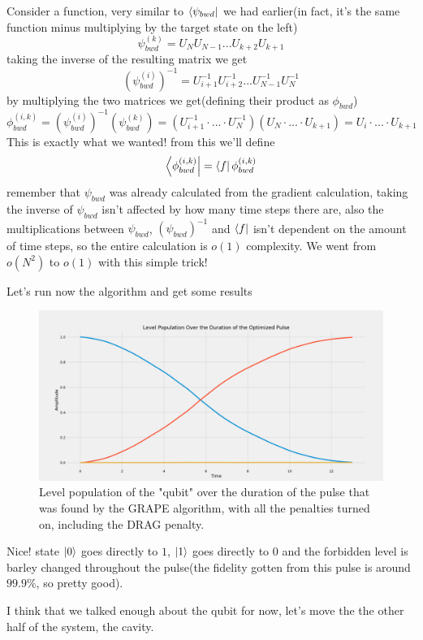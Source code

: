 \documentclass[english, a4paper, 12pt, twoside]{article}
\numberwithin{equation}{section} %
\begin{document}
Consider a function, very similar to  $\bra{\psi_{bwd}}$ we had earlier(in fact, it's the same function minus multiplying by the target state on the left)
\[
    \psi_{bwd}^{(k)} = U_NU_{N-1}...U_{k+2}U_{k+1}
\]
taking the inverse of the resulting matrix we get
\[
    (\psi_{bwd}^{(i)})^{-1} = U_{i+1}^{-1}U_{i+2}^{-1}...U_{N-1}^{-1}U_{N}^{-1}
\]
by multiplying the two matrices we get(defining their product as $\phi_{bwd}$)
\[
    \phi_{bwd}^{(i,k)} = (\psi_{bwd}^{(i)})^{-1}(\psi_{bwd}^{(k)}) = (U_{i+1}^{-1}\cdot...\cdot U_{N}^{-1})(U_N\cdot...\cdot U_{k+1}) = U_{i}\cdot...\cdot U_{k+1}
\]
This is exactly what we wanted! from this we'll define
\[
    \bra{\phi_{bwd}^{(i,k)}} = \bra{f}\phi_{bwd}^{(i,k)}
\]
remember that $\psi_{bwd}$ was already calculated from the gradient calculation, taking the inverse of $\psi_{bwd}$ isn't affected by how many time steps there are, also the multiplications between $\psi_{bwd}$, $(\psi_{bwd})^{-1}$ and $\bra{f}$ isn't dependent on the amount of time steps, so the entire calculation is $o(1)$ complexity. We went from $o(N^2)$ to $o(1)$ with this simple trick!

Let's run now the algorithm and get some results
\begin{figure}[H]
    \centering
    \includegraphics[width=1\columnwidth]{Results/DRAG/level-population2.png}
    \caption{Level population of the "qubit" over the duration of the pulse that was found by the GRAPE algorithm, with all the penalties turned on, including the DRAG penalty.}
    \label{fig:sDRAG-results}
\end{figure}
Nice! state $\ket{0}$ goes directly to $1$, $\ket{1}$ goes directly to $0$ and the forbidden level is barley changed throughout the pulse(the fidelity gotten from this pulse is around $99.9\%$, so pretty good).

I think that we talked enough about the qubit for now, let's move the the other half of the system, the cavity.
\end{document}

